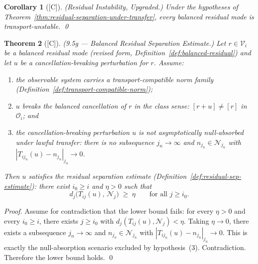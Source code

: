\documentclass[12pt,oneside]{amsbook}
\theoremstyle{plain}
\newtheorem{theorem}{Theorem}[section]
\newtheorem{corollary}[theorem]{Corollary}
\theoremstyle{definition}
\theoremstyle{remark}
\newcommand{\status}[1]{\textup{[#1]}}
\begin{document}
\begin{corollary}[\status{C}]\label{cor:residual-instability-upgraded}
\textup{(Residual Instability, Upgraded.)}
Under the hypotheses of
Theorem~\ref{thm:residual-separation-under-transfer}, every balanced
residual mode is transport-unstable. \qed
\end{corollary}

\begin{theorem}[\status{C}]\label{thm:9-5g-balanced-residual-sep}
\textup{(9.5g --- Balanced Residual Separation Estimate.)}
Let $r \in \mathcal{V}_i$ be a balanced residual mode (revised form,
Definition~\ref{def:balanced-residual}) and let $u$ be a
cancellation-breaking perturbation for $r$.  Assume:
\begin{enumerate}[label=\textup{(\arabic*)}]
  \item the observable system carries a transport-compatible norm
    family (Definition~\ref{def:transport-compatible-norm});
  \item $u$ breaks the balanced cancellation of $r$ in the class
    sense: $[r+u] \neq [r]$ in $\mathcal{O}_i$; and
  \item the cancellation-breaking perturbation $u$ is not
    asymptotically null-absorbed under lawful transfer: there is no
    subsequence $j_n \to \infty$ and $n_{j_n} \in \mathcal{N}_{j_n}$
    with $|T_{ij_n}(u) - n_{j_n}|_{j_n} \to 0$.
\end{enumerate}
Then $u$ satisfies the residual separation estimate
(Definition~\ref{def:residual-sep-estimate}): there exist $i_0 \geq i$
and $\eta > 0$ such that
\[
  d_j\!\bigl(T_{ij}(u),\,\mathcal{N}_j\bigr) \;\geq\; \eta
  \qquad \text{for all } j \geq i_0.
\]
\end{theorem}

\begin{proof}
Assume for contradiction that the lower bound fails: for every
$\eta > 0$ and every $i_0 \geq i$, there exists $j \geq i_0$ with
$d_j(T_{ij}(u),\mathcal{N}_j) < \eta$.  Taking $\eta \to 0$, there
exists a subsequence $j_n \to \infty$ and $n_{j_n} \in
\mathcal{N}_{j_n}$ with $|T_{ij_n}(u) - n_{j_n}|_{j_n} \to 0$.
This is exactly the null-absorption scenario excluded by hypothesis~(3).
Contradiction.  Therefore the lower bound holds. \qed
\end{proof}
\end{document}
